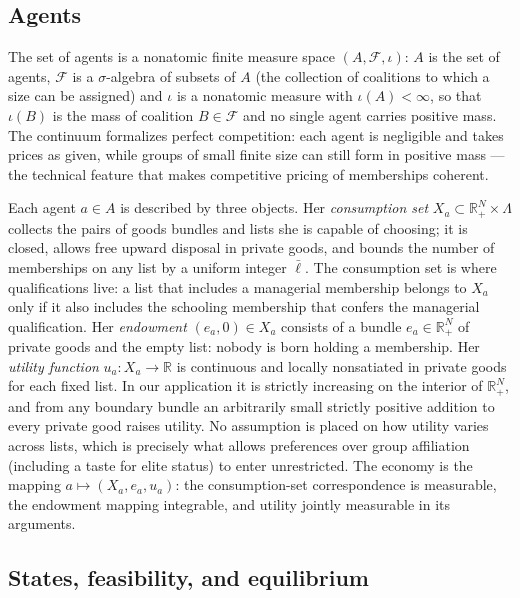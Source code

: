 \documentclass[12pt,letterpaper]{article}
\theoremstyle{definition}
\newcommand{\R}{\mathbb{R}}
\begin{document}
\subsection{Agents}

The set of agents is a nonatomic finite measure space $(A,\mathcal{F},\iota)$: $A$ is the set of agents, $\mathcal{F}$ is a $\sigma$-algebra of subsets of $A$ (the collection of coalitions to which a size can be assigned) and $\iota$ is a nonatomic measure with $\iota(A)<\infty$, so that $\iota(B)$ is the mass of coalition $B\in\mathcal{F}$ and no single agent carries positive mass.
The continuum formalizes perfect competition: each agent is negligible and takes prices as given, while groups of small finite size can still form in positive mass --- the technical feature that makes competitive pricing of memberships coherent.

Each agent $a\in A$ is described by three objects.
Her \emph{consumption set} $X_a\subset\R^N_+\times\Lambda$ collects the pairs of goods bundles and lists she is capable of choosing; it is closed, allows free upward disposal in private goods, and bounds the number of memberships on any list by a uniform integer $\bar{\ell}$.
The consumption set is where qualifications live: a list that includes a managerial membership belongs to $X_a$ only if it also includes the schooling membership that confers the managerial qualification.
Her \emph{endowment} $(e_a,0)\in X_a$ consists of a bundle $e_a\in\R^N_+$ of private goods and the empty list: nobody is born holding a membership.
Her \emph{utility function} $u_a:X_a\rightarrow\R$ is continuous and locally nonsatiated in private goods for each fixed list.
In our application it is strictly increasing on the interior of $\R^N_+$, and from any boundary bundle an arbitrarily small strictly positive addition to every private good raises utility.
No assumption is placed on how utility varies across lists, which is precisely what allows preferences over group affiliation (including a taste for elite status) to enter unrestricted.
The economy is the mapping $a\mapsto(X_a,e_a,u_a)$: the consumption-set correspondence is measurable, the endowment mapping integrable, and utility jointly measurable in its arguments.

\subsection{States, feasibility, and equilibrium}
\end{document}
